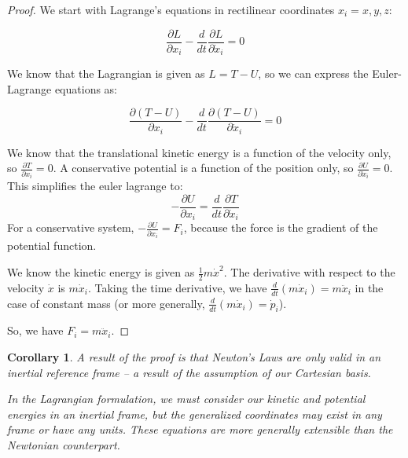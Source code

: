 \documentclass[10pt, openany, titlepage]{book}
\newtheorem{corollary}{Corollary}[theorem]
\theoremstyle{definition}
\begin{document}
\begin{proof}
We start with Lagrange's equations in rectilinear coordinates $x_i=x,y,z$:

$$\frac{\partial L}{\partial x_i}-\frac{d}{dt}\frac{\partial L}{\partial \dot{x}_i}=0 $$

We know that the \gls{Lagrangian} is given as $L=T-U$, so we can express the Euler-Lagrange equations as:

$$\frac{\partial (T-U)}{\partial x_i}-\frac{d}{dt}\frac{\partial (T-U)}{\partial \dot{x}_i}=0$$

We know that the translational kinetic energy is a function of the velocity only, so $\frac{\partial T}{\partial x_i}=0$. A \gls{conservative} potential is a function of the position only, so $\frac{\partial U}{\partial \dot{x}_i}=0$. This simplifies the \gls{euler lagrange} to:
$$-\frac{\partial U}{\partial x_i}=\frac{d}{dt}\frac{\partial T}{\partial \dot{x}_i}$$
For a \gls{conservative} system, $-\frac{\partial U}{\partial x_i}=F_i$, because the force is the gradient of the potential function.

We know the kinetic energy is given as $\frac{1}{2}m\dot{x}^2$. The derivative with respect to the velocity $\dot{x}$ is $m\dot{x}_i$. Taking the time derivative, we have $\frac{d}{dt}(m\dot{x}_i)=m\ddot{x}_i$ in the case of constant mass (or more generally,  $\frac{d}{dt}(m\dot{x}_i)=\dot{p}_i$).

So, we have $F_i=m\ddot{x}_i$.

\end{proof}
\begin{corollary}
A result of the proof is that Newton's Laws are only valid in an inertial reference frame -- a result of the assumption of our Cartesian basis.

In the Lagrangian formulation, we must consider our kinetic and potential energies in an inertial frame, but the \glspl{generalized coordinate} may exist in any frame or have any units. These equations are more generally extensible than the Newtonian counterpart.
\end{corollary}
\end{document}
